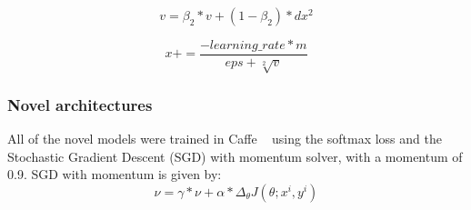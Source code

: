 \documentclass[10pt,twocolumn,letterpaper]{article}
\begin{document}
\begin{equation}
v=\beta_2*v + (1-\beta_2) * dx^2
\end{equation}

\begin{equation}
x+= \frac{- learning\_rate * m}{eps + \sqrt[2]{v}}
\end{equation}

\subsubsection{Novel architectures}
All of the novel models were trained in Caffe ~\cite{jia2014caffe} using the softmax loss and the Stochastic Gradient Descent (SGD) with momentum solver, with a momentum of 0.9. SGD with momentum is given by: 
\begin{equation}
\nu = \gamma*\nu + \alpha*\Delta_{\theta}J(\theta; x^{i}, y^{i})
\end{equation}
\end{document}
